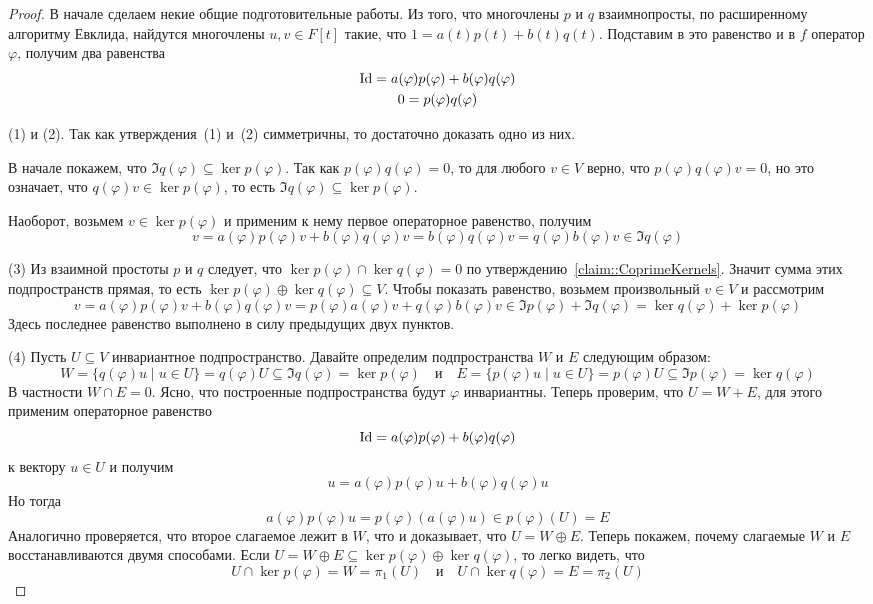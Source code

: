 \begin{proof}
В начале сделаем некие общие подготовительные работы.
Из того, что многочлены $p$ и $q$ взаимнопросты, по расширенному алгоритму Евклида, найдутся многочлены $u,v\in F[t]$ такие, что $1 = a(t)p(t) + b(t)q(t)$.
Подставим в это равенство и в $f$ оператор $\varphi$, получим два равенства
\begin{gather*}
\operatorname{Id} = a(\varphi) p(\varphi) + b(\varphi) q(\varphi)\\
0 = p(\varphi) q(\varphi)
\end{gather*}

(1) и (2).
Так как утверждения~(1) и~(2) симметричны, то достаточно доказать одно из них.

В начале покажем, что $\Im q(\varphi)\subseteq \ker p(\varphi)$.
Так как $p(\varphi)q(\varphi) = 0$, то для любого $v\in V$ верно, что $p(\varphi)q(\varphi)v = 0$, но это означает, что $q(\varphi)v \in\ker p(\varphi)$, то есть $\Im q(\varphi)\subseteq \ker p(\varphi)$.

Наоборот, возьмем $v\in \ker p(\varphi)$ и применим к нему первое операторное равенство, получим
\[
v = a(\varphi) p(\varphi) v + b(\varphi) q(\varphi) v = b(\varphi) q(\varphi) v =   q(\varphi) b(\varphi) v\in \Im q(\varphi)
\]

(3) Из взаимной простоты $p$ и $q$ следует, что $\ker p(\varphi) \cap \ker q(\varphi) = 0$ по утверждению~\ref{claim::CoprimeKernels}.
Значит сумма этих подпространств прямая, то есть $\ker p(\varphi) \oplus \ker q(\varphi) \subseteq V$.
Чтобы показать равенство, возьмем произвольный $v\in V$ и рассмотрим
\[
v = a(\varphi) p(\varphi) v + b(\varphi) q(\varphi) v = p(\varphi) a(\varphi) v + q(\varphi) b(\varphi) v\in \Im p(\varphi) +\Im q(\varphi) = \ker q(\varphi) + \ker p(\varphi)
\]
Здесь последнее равенство выполнено в силу предыдущих двух пунктов.

(4) Пусть $U\subseteq V$ инвариантное подпространство.
Давайте определим подпространства $W$ и $E$ следующим образом: 
\[
W = \{q(\varphi) u \mid u\in U\} = q(\varphi) U\subseteq \Im q(\varphi) = \ker p(\varphi)
\quad \text{и}\quad
E = \{p(\varphi) u \mid u\in U\} = p(\varphi) U \subseteq \Im p(\varphi) = \ker q(\varphi)
\]
В частности $W\cap E = 0$.
Ясно, что построенные подпространства будут $\varphi$ инвариантны.
Теперь проверим, что $U = W + E$, для этого применим операторное равенство
\[
\operatorname{Id} = a(\varphi) p(\varphi) + b(\varphi) q(\varphi)
\]
к вектору $u\in U$ и получим
\[
u = a(\varphi) p(\varphi)u + b(\varphi) q(\varphi)u
\]
Но тогда 
\[
a(\varphi) p(\varphi)u =  p(\varphi)(a(\varphi)u) \in p(\varphi)(U) = E
\]
Аналогично проверяется, что второе слагаемое лежит в $W$, что и доказывает, что $U = W\oplus E$.
Теперь покажем, почему слагаемые $W$ и $E$ восстанавливаются двумя способами.
Если $U = W \oplus E \subseteq \ker p(\varphi) \oplus \ker q(\varphi)$, то легко видеть, что 
\[
U \cap \ker p(\varphi) = W = \pi_1(U)
\quad\text{и}\quad
U \cap \ker q(\varphi) = E = \pi_2(U)
\]


\end{proof}
